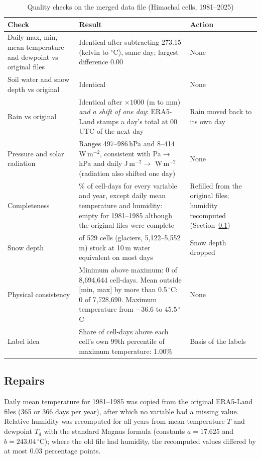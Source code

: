 \documentclass[12pt,a4paper]{report}
\begin{document}
\begin{table}[H]
\centering
\caption{Quality checks on the merged data file (Himachal cells, 1981--2025)}
\label{tab:qc}
\footnotesize
\begin{tabularx}{\textwidth}{|>{\raggedright\arraybackslash}p{3.6cm}|>{\raggedright\arraybackslash}X|>{\raggedright\arraybackslash}p{4.4cm}|}
\hline
\textbf{Check} & \textbf{Result} & \textbf{Action}\\ \hline
Daily max, min, mean temperature and dewpoint vs original files & Identical after subtracting 273.15 (kelvin to
$^\circ$C), same day; largest difference 0.00 & None\\ \hline
Soil water and snow depth vs original & Identical & None\\ \hline
Rain vs original & Identical after $\times1000$ (m to mm) \emph{and a shift of one day}: ERA5-Land stamps a day's
total at 00\,UTC of the next day & Rain moved back to its own day\\ \hline
Pressure and solar radiation & Ranges 497--986\,hPa and 8--414\,W\,m$^{-2}$, consistent with Pa$\to$hPa and daily
J\,m$^{-2}\to$ W\,m$^{-2}$ (radiation also shifted one day) & None\\ \hline
Completeness & 100\% of cell-days for every variable and year, except daily mean temperature and humidity: empty for
1981--1985 although the original files were complete & Refilled from the original files; humidity recomputed
(Section~\ref{sec:repairs})\\ \hline
Snow depth & 6 of 529 cells (glaciers, 5{,}122--5{,}552\,m) stuck at 10\,m water equivalent on most days & Snow depth
dropped\\ \hline
Physical consistency & Minimum above maximum: 0 of 8{,}694{,}644 cell-days. Mean outside [min, max] by more than
0.5\,$^\circ$C: 0 of 7{,}728{,}690. Maximum temperature from $-36.6$ to $45.5\,^\circ$C & None\\ \hline
Label idea & Share of cell-days above each cell's own 99th percentile of maximum temperature: 1.00\% & Basis of the
labels\\ \hline
\end{tabularx}
\end{table}

\subsection{Repairs}
\label{sec:repairs}
Daily mean temperature for 1981--1985 was copied from the original ERA5-Land files (365 or 366 days per year), after
which no variable had a missing value. Relative humidity was recomputed for all years from mean temperature $T$ and
dewpoint $T_d$ with the standard Magnus formula (constants $a=17.625$ and $b=243.04\,^\circ$C); where the old file had humidity, the recomputed values differed by at most 0.03 percentage points.
\end{document}
